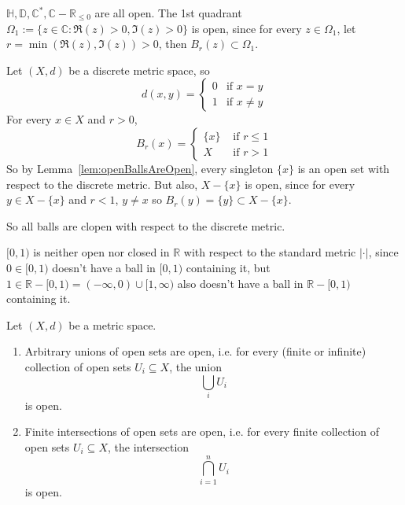 \begin{example}
	$\mathbb{H}, \mathbb{D}, \mathbb{C}^*, \mathbb{C} - \mathbb{R}_{\le 0}$ are all open. The 1st quadrant $\Omega_1 := \{ z \in \mathbb{C}: \Re(z) > 0, \Im(z) > 0 \}$ is open, since for every $z \in \Omega_1$, let $r = \min( \Re(z), \Im(z) ) > 0$, then $B_r(z) \subset \Omega_1$.
\end{example}

\begin{example}
	Let $(X, d)$ be a discrete metric space, so
	\[
		d(x, y) = \begin{cases}
			0 & \text{if } x = y \\
			1 & \text{if } x \ne y
		\end{cases}
	\]
	For every $x \in X$ and $r > 0$,
	\[
		B_r(x) = \begin{cases}
			\{x\} & \text{ if } r \le 1 \\
			X & \text{ if } r > 1
		\end{cases}
	\]
	So by Lemma~\ref{lem:openBallsAreOpen}, every singleton $\{ x \}$ is an open set with respect to the discrete metric. But also, $X - \{ x \}$ is open, since for every $y \in X - \{ x \}$ and $r < 1$, $y \ne x$ so $B_r(y) = \{ y \} \subset X - \{ x \}$.

	So all balls are clopen with respect to the discrete metric.
\end{example}

\begin{example}
	$[0, 1)$ is neither open nor closed in $\mathbb{R}$ with respect to the standard metric $|\cdot|$, since $0 \in [0, 1)$ doesn't have a ball in $[0, 1)$ containing it, but $1 \in \mathbb{R} - [0, 1) = (-\infty, 0) \cup [1, \infty)$ also doesn't have a ball in $\mathbb{R} - [0, 1)$ containing it.
\end{example}

\begin{lemma}\label{lem:unionsAndIntersectionsOpen}
	Let $(X, d)$ be a metric space.
	\begin{enumerate}
		\item Arbitrary unions of open sets are open, i.e. for every (finite or infinite) collection of open sets $U_i \subseteq X$, the union
		\[
			\bigcup_{i} U_i
		\]
		is open.
		\item Finite intersections of open sets are open, i.e. for every finite collection of open sets $U_i \subseteq X$, the intersection
		\[
			\bigcap_{i = 1}^n U_i
		\]
		is open.
	\end{enumerate}
\end{lemma}

